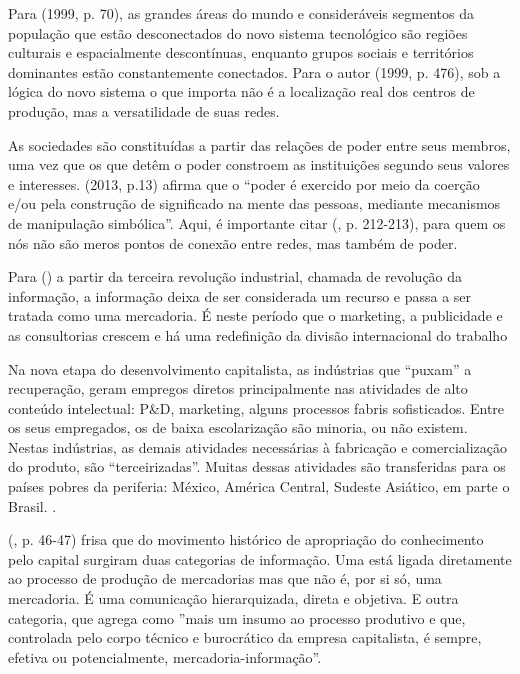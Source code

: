\documentclass[
	article,			%
	12pt,				%
	oneside,			%
	a4paper,			%
	english,			%
	brazil,				%
	]{abntex2}
\begin{document}
Para  (1999, p. 70), as grandes áreas do mundo e consideráveis segmentos da população que estão desconectados do novo sistema tecnológico são regiões culturais e espacialmente descontínuas, enquanto grupos sociais e territórios dominantes estão constantemente conectados. Para o autor (1999, p. 476), sob a lógica do novo sistema o que importa não é a localização real dos centros de produção, mas a versatilidade de suas redes.

As sociedades são constituídas a partir das relações de poder entre seus membros, uma vez que os que detêm o poder constroem as instituições segundo seus valores e interesses.  (2013, p.13) afirma que o “poder é exercido por meio da coerção e/ou pela construção de significado na mente das pessoas, mediante mecanismos de manipulação simbólica”.  Aqui, é importante citar  (\citeyear{raffestin1993}, p. 212-213), para quem os nós não são meros pontos de conexão entre redes, mas também de poder.

Para  (\citeyear{dantas2003}) a partir da terceira revolução industrial, chamada de revolução da informação, a informação deixa de ser considerada um recurso e passa a ser tratada como uma mercadoria. É neste período que o marketing, a publicidade e as consultorias crescem e há uma redefinição da divisão internacional do trabalho

\begin{citacao}
Na nova etapa do desenvolvimento capitalista, as indústrias que
“puxam” a recuperação, geram empregos diretos principalmente nas atividades
de alto conteúdo intelectual: P\&D, marketing, alguns processos fabris
sofisticados. Entre os seus empregados, os de baixa escolarização são minoria,
ou não existem. Nestas indústrias, as demais atividades necessárias à fabricação
e comercialização do produto, são “terceirizadas”. Muitas dessas
atividades são transferidas para os países pobres da periferia: México,
América Central, Sudeste Asiático, em parte o Brasil. \cite[p. 21-22]{dantas2003}.
\end{citacao}

 (\citeyear{bolano2000}, p. 46-47) frisa que do movimento histórico de apropriação do conhecimento pelo capital surgiram duas categorias de informação. Uma está ligada diretamente ao processo de produção de mercadorias mas que não é, por si só, uma mercadoria. É uma comunicação hierarquizada, direta e objetiva. E outra categoria, que agrega como ''mais um insumo ao processo produtivo e que, controlada pelo corpo técnico e burocrático da empresa capitalista, é sempre, efetiva ou potencialmente, mercadoria-informação”.
\end{document}
